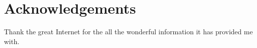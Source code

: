 \chapter{Acknowledgements}
Thank the great Internet for the all the wonderful information it has provided me with.

